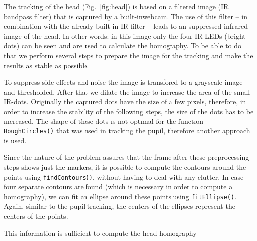 The tracking of the head (Fig.~\ref{fig:head}) is based on a filtered image (IR bandpass filter) that is captured by a built-inwebcam. The use of this filter -- in combination with the already built-in IR-filter -- leads to an suppressed infrared image of the head.
In other words: in this image only the four IR-LEDs (bright dots) can be seen and are used to calculate the homography. 
To be able to do that we perform several steps to prepare the image for the tracking and make the results as stable as possible.

To suppress side effects and noise the image is transfored to a grayscale image and thresholded. 
After that we dilate the image to increase the area of the small IR-dots. Originally the captured dots have the size of a few pixels, therefore, in order to increase the stability of the following steps, the size of the dots has to be increased. 
The shape of these dots is not optimal for the function \texttt{HoughCircles()} that was used in tracking the pupil, therefore another approach is used. 

Since the nature of the problem assures that the frame after these preprocessing steps shows just the markers, it is possible to compute the contours around the points using \texttt{findContours()}, without having to deal with any clutter. 
In case four separate contours are found (which is necessary in order to compute a homography), we can fit an ellipse around these points using \texttt{fitEllipse()}. Again, similar to the pupil tracking, the centers of the ellipses represent the centers of the points.

This information is sufficient to compute the head homography
 

